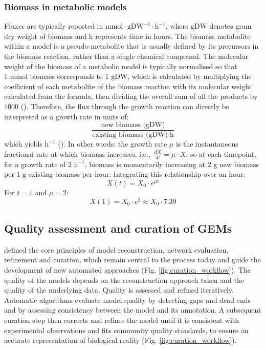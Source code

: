 \subsubsection{Biomass in metabolic models}
Fluxes are typically reported in $\text{mmol} \cdot \text{gDW}^{-1} \cdot \text{h}^{-1}$, where $\text{gDW}$ denotes gram dry weight of biomass and $\text{h}$ represents time in hours. The biomass metabolite within a model is a pseudo-metabolite that is usually defined by its precursors in the biomass reaction, rather than a single chemical compound. The molecular weight of the biomass of a metabolic model is typically normalised so that $1\text{ mmol}$ biomass corresponds to $1\text{ gDW}$, which is calculated by multiplying the coefficient of each metabolite of the biomass reaction with its molecular weight calculated from the formula, then dividing the overall sum of all the products by $1000$ (\cite{lieven_memote_2020}). Therefore, the flux through the growth reaction can directly be interpreted as a growth rate in units of:
\[
\frac{\text{new biomass (gDW)}}{\text{existing biomass (gDW)} \cdot \text{h}}
\]
which yields $\text{h}^{-1}$ (\cite{machado_fast_2018}). In other words: the growth rate $\mu$ is the instantaneous fractional rate at which biomass increases, i.e.,\ $\frac{dX}{dt} = \mu \cdot X$, so at each timepoint, for a growth rate of $2\text{ h}^{-1}$, biomass is momentarily increasing at $2\text{ g}$ new biomass per $1\text{ g}$ existing biomass per hour. Integrating this relationship over an hour:
\[
X(t) = X_0 \cdot e^{\mu t}
\]
For $t = 1$ and $\mu = 2$:
\[
X(1) = X_0 \cdot e^{2} \approx X_0 \cdot 7.39
\]
\subsection{Quality assessment and curation of GEMs}
\cite{thiele_protocol_2010} defined the core principles of model reconstruction, network evaluation, refinement and curation, which remain central to the process today and guide the development of new automated approaches (Fig. \ref{fig:curation_workflow}). The quality of the models depends on the reconstruction approach taken and the quality of the underlying data. Quality is assessed and refined iteratively. Automatic algorithms evaluate model quality by detecting gaps and dead ends and by assessing consistency between the model and its annotation. A subsequent curation step then corrects and refines the model until it is consistent with experimental observations and fits community quality standards, to ensure an accurate representation of biological reality (Fig. \ref{fig:curation_workflow}).

